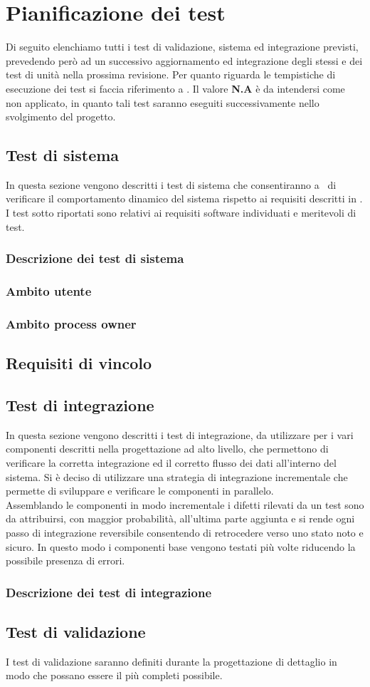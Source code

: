 \section{Pianificazione dei test}
Di seguito elenchiamo tutti i test di validazione, sistema ed integrazione previsti, prevedendo però ad un successivo aggiornamento ed integrazione degli stessi e dei test di unità nella prossima revisione. Per quanto riguarda le tempistiche di esecuzione dei test si faccia riferimento a \infoPDP.
Il valore \textbf{N.A} è da intendersi come non applicato, in quanto tali test saranno eseguiti successivamente nello svolgimento del progetto.
\subsection{Test di sistema}
In questa sezione vengono descritti i test di sistema che consentiranno a \gruppo ~di verificare il comportamento dinamico del sistema rispetto ai requisiti descritti in \infoAR. I test sotto riportati sono relativi ai requisiti software individuati e meritevoli di test.
\subsubsection{Descrizione dei test di sistema}
\subsubsection{Ambito utente}
\subsubsection{Ambito process owner}
\subsection{Requisiti di vincolo}
\subsection{Test di integrazione}
In questa sezione vengono descritti i test di integrazione, da utilizzare per i vari componenti descritti nella progettazione ad alto livello, che permettono di verificare la corretta integrazione ed il corretto flusso dei dati all’interno del sistema.
Si è deciso di utilizzare una strategia di integrazione incrementale che permette di
sviluppare e verificare le componenti in parallelo.\\
Assemblando le componenti in modo incrementale i difetti rilevati da un test sono da
attribuirsi, con maggior probabilità, all’ultima parte aggiunta e si rende ogni passo di
integrazione reversibile consentendo di retrocedere verso uno stato noto e sicuro.
In questo modo i componenti base vengono testati più volte riducendo la possibile presenza di errori.
\subsubsection{Descrizione dei test di integrazione}
\subsection{Test di validazione}
I test di validazione saranno definiti durante la progettazione di dettaglio in modo che possano essere il più completi possibile.

